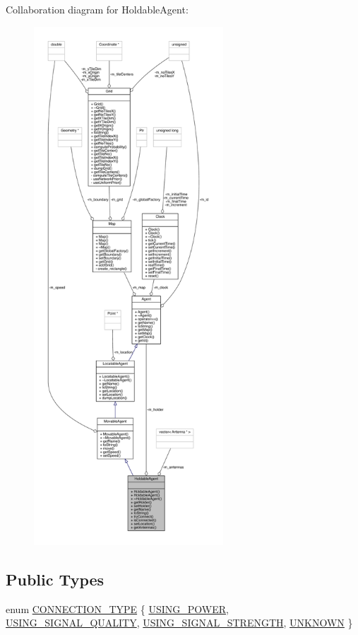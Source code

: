 Collaboration diagram for Holdable\+Agent\+:\nopagebreak
\begin{figure}[H]
\begin{center}
\leavevmode
\includegraphics[height=550pt]{class_holdable_agent__coll__graph}
\end{center}
\end{figure}
\subsection*{Public Types}
\begin{DoxyCompactItemize}
\item 
enum \mbox{\hyperlink{class_holdable_agent_ae2c334b004d7b9c5a999cf2618e4e518}{C\+O\+N\+N\+E\+C\+T\+I\+O\+N\+\_\+\+T\+Y\+PE}} \{ \mbox{\hyperlink{class_holdable_agent_ae2c334b004d7b9c5a999cf2618e4e518ab8f4a3956d88a54e0aad08e89e203fd6}{U\+S\+I\+N\+G\+\_\+\+P\+O\+W\+ER}}, 
\mbox{\hyperlink{class_holdable_agent_ae2c334b004d7b9c5a999cf2618e4e518a93c5b260edf949c65b96fec443c33f2b}{U\+S\+I\+N\+G\+\_\+\+S\+I\+G\+N\+A\+L\+\_\+\+Q\+U\+A\+L\+I\+TY}}, 
\mbox{\hyperlink{class_holdable_agent_ae2c334b004d7b9c5a999cf2618e4e518ac0a762a4e8fa38dd6285f84aefadd3f4}{U\+S\+I\+N\+G\+\_\+\+S\+I\+G\+N\+A\+L\+\_\+\+S\+T\+R\+E\+N\+G\+TH}}, 
\mbox{\hyperlink{class_holdable_agent_ae2c334b004d7b9c5a999cf2618e4e518a6bdb1529a2032a4648226328e179f552}{U\+N\+K\+N\+O\+WN}}
 \}
\end{DoxyCompactItemize}
